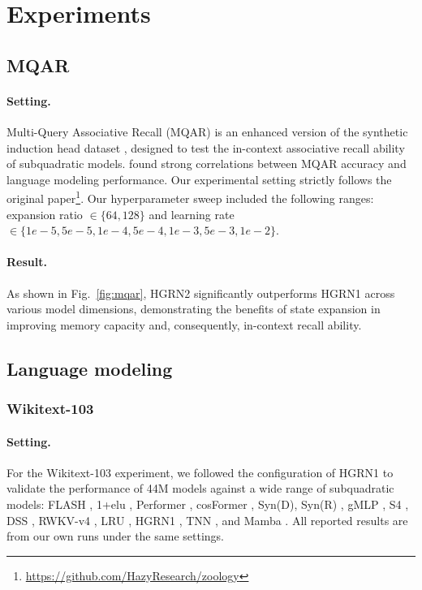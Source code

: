 \section{Experiments}

\subsection{MQAR} 

\paragraph{Setting.} Multi-Query Associative Recall (MQAR) \citep{zoology2023} is an enhanced version of the synthetic induction head dataset \citep{h3}, designed to test the in-context associative recall ability of subquadratic models. \citet{zoology2023} found strong correlations between MQAR accuracy and language modeling performance. Our experimental setting strictly follows the original paper\footnote{\url{https://github.com/HazyResearch/zoology}}. Our hyperparameter sweep included the following ranges: expansion ratio \(\in \{64, 128\}\) and learning rate \(\in \{1e-5, 5e-5, 1e-4, 5e-4, 1e-3, 5e-3, 1e-2\}\).

\paragraph{Result.} As shown in Fig.~\ref{fig:mqar}, HGRN2 significantly outperforms HGRN1 across various model dimensions, demonstrating the benefits of state expansion in improving memory capacity and, consequently, in-context recall ability.

\subsection{Language modeling}
\subsubsection{Wikitext-103}

\paragraph{Setting.} For the Wikitext-103 experiment, we followed the configuration of HGRN1 to validate the performance of 44M models against a wide range of subquadratic models: FLASH \citep{GAU}, 1+elu \citep{katharopoulos2020transformers}, Performer \citep{performer}, cosFormer \citep{cosformer}, Syn(D), Syn(R) \citep{tay2021synthesizer}, gMLP \citep{liu2021pay}, S4 \citep{s4}, DSS \citep{Gupta2022DiagonalSS}, RWKV-v4 \citep{rwkv}, LRU \citep{LRU}, HGRN1 \citep{HGRN}, TNN \citep{qin2023toeplitz}, and Mamba \citep{Gu2023MambaLS}. All reported results are from our own runs under the same settings.

